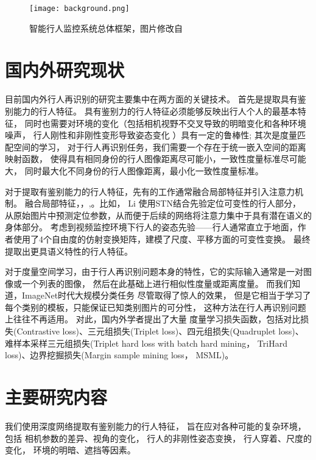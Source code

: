 \begin{figure}
	\texttt{[image: background.png]}
	\caption{智能行人监控系统总体框架，图片修改自~\cite{zheng2017person}}
	\label{fig:overall}
\end{figure}

\section{国内外研究现状}

目前国内外行人再识别的研究主要集中在两方面的关键技术。
首先是提取具有鉴别能力的行人特征。
具有鉴别力的行人特征必须能够反映出行人个人的最基本特征，
同时也需要对环境的变化（包括相机视野不交叉导致的明暗变化和各种环境噪声，
行人刚性和非刚性变形导致姿态变化
）具有一定的鲁棒性;
其次是度量匹配空间的学习，
对于行人再识别任务，我们需要一个存在于统一嵌入空间的距离映射函数，
使得具有相同身份的行人图像距离尽可能小，一致性度量标准尽可能大，
同时最大化不同身份的行人图像距离，最小化一致性度量标准。

对于提取有鉴别能力的行人特征，先有的工作通常融合局部特征并引入注意力机制。
融合局部特征\cite{reciprocal}，\cite{liu2017hydraplus}，\cite{zhao2017spindle},\cite{glad}。比如，
Li \etal \cite{latent}使用STN结合先验定位可变性的行人部分，
从原始图片中预测定位参数，从而便于后续的网络将注意力集中于具有潜在语义的身体部分。
考虑到视频监控环境下行人的姿态先验——行人通常直立于地面，作者使用了4个自由度的仿射变换矩阵，建模了尺度、平移方面的可变性变换。
最终提取出更具语义特性的行人特征。

对于度量空间学习，由于行人再识别问题本身的特性，它的实际输入通常是一对图像或一个列表的图像，
然后在此基础上进行相似性度量或距离度量。
而我们知道，ImageNet时代大规模分类任务\cite{deng2009imagenet}
尽管取得了惊人的效果，
但是它相当于学习了每个类别的模板，只能保证已知类别图片的可分性，
这种方法在行人再识别问题上往往不再适用。
对此，国内外学者提出了大量
度量学习损失函数，包括对比损失(Contrastive loss)\cite{varior2016gated}、三元组损失(Triplet loss)\cite{schroff2015facenet}、四元组损失(Quadruplet loss)\cite{chen2017beyond}、难样本采样三元组损失(Triplet hard loss with batch hard mining， TriHard loss)\cite{hermans2017defense}、边界挖掘损失(Margin sample mining loss， MSML)\cite{xiao2017margin}。

\section{主要研究内容}

我们使用深度网络提取有鉴别能力的行人特征，
旨在应对各种可能的复杂环境，
包括
相机参数的差异、视角的变化，
行人的非刚性姿态变换，
行人穿着、尺度的变化，
环境的明暗、遮挡等因素。


